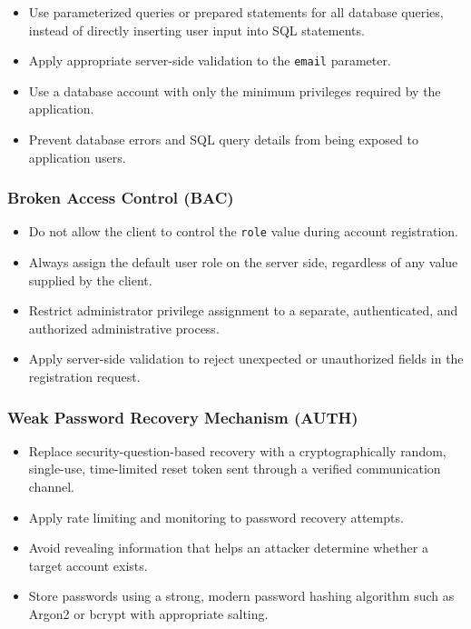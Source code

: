 \begin{itemize}
    \item Use parameterized queries or prepared statements for all
    database queries, instead of directly inserting user input into
    SQL statements.

    \item Apply appropriate server-side validation to the
    \texttt{email} parameter.

    \item Use a database account with only the minimum privileges
    required by the application.

    \item Prevent database errors and SQL query details from being
    exposed to application users.
\end{itemize}

\subsubsection*{Broken Access Control (BAC)}

\begin{itemize}
    \item Do not allow the client to control the \texttt{role} value
    during account registration.

    \item Always assign the default user role on the server side,
    regardless of any value supplied by the client.

    \item Restrict administrator privilege assignment to a separate,
    authenticated, and authorized administrative process.

    \item Apply server-side validation to reject unexpected or
    unauthorized fields in the registration request.
\end{itemize}

\subsubsection*{Weak Password Recovery Mechanism (AUTH)}

\begin{itemize}
    \item Replace security-question-based recovery with a
    cryptographically random, single-use, time-limited reset token
    sent through a verified communication channel.

    \item Apply rate limiting and monitoring to password recovery
    attempts.

    \item Avoid revealing information that helps an attacker determine
    whether a target account exists.

    \item Store passwords using a strong, modern password hashing
    algorithm such as Argon2 or bcrypt with appropriate salting.
\end{itemize}

